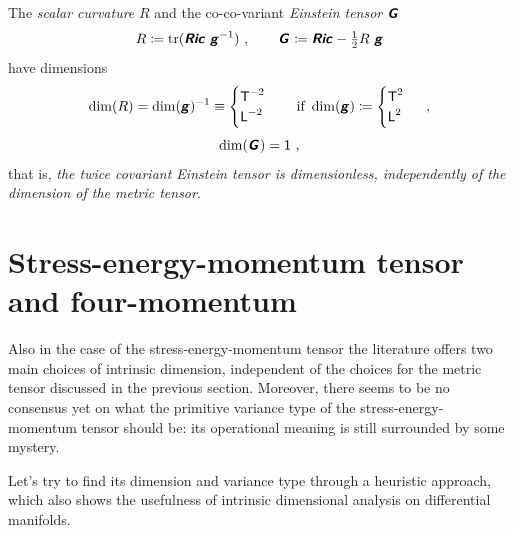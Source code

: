\documentclass[\ifafour a4paper,12pt,\else a5paper,10pt,\fi%
onecolumn,oneside,article,%
british%
]{memoir}
\makeatletter
\theoremstyle{remark}
\theoremstyle{innote}
\newcommand*{\mathte}[1]{\textbf{\textit{\textsf{#1}}}}
\DeclareMathOperator{\tr}{tr}%
\newcommand*{\defd}{\coloneqq}
\renewcommand*{\|}[1][]{\nonscript\,#1\vert\nonscript\;\mathopen{}}
\newcommand*{\q}{}%
\DeclareRobustCommand*{\q}{%
  \mathbin{\mathpalette\bigcdot@{}}%
}
\newcommand*{\bigcdot@scalefactor}{0.7}
\newcommand*{\bigcdot@widthfactor}{1.5}
\newcommand*{\bigcdot@}[2]{%
  \sbox0{$#1\vcenter{}$}%
  \sbox2{$#1\cdot\m@th$}%
  \hbox to \bigcdot@widthfactor\wd2{%
    \hfil
    \raise\ht0\hbox{%
      \scalebox{\bigcdot@scalefactor}{%
        \lower\ht0\hbox{$#1\bullet\m@th$}%
      }%
    }%
    \hfil
  }%
}
\newcommand*{\Un}{\textsf{1}}
\newcommand*{\Le}{\textsf{L}}
\newcommand*{\Ti}{\textsf{T}}
\newcommand*{\yg}{\mathte{g}}
\newcommand*{\yG}{\mathte{G}}
\newcommand*{\yRi}{\mathte{Ric}}
\newcommand*{\ysc}{R}
\renewcommand*{\i}{\indices}
\makeatother
\begin{document}
\medskip

The \emph{scalar curvature} $\ysc$ and the co-co-variant \emph{Einstein
  tensor} $\yG\i{_{\q\q}}$
\begin{equation}
  \label{eq:curv_einst}
  \ysc \defd %
  \tr(\yRi\ \yg^{-1})
  \ ,
  \qquad
  \yG\i{_{\q\q}} \defd \yRi -%
  \tfrac{1}{2} \ysc\ \yg %
\end{equation}
have  dimensions
\begin{gather}
  \label{eq:dim_scalcurv}
  \dim(\ysc) = \dim(\yg)^{-1} \equiv
  \begin{cases}
    \Ti^{-2} \\
    \Le^{-2}
  \end{cases}
  \quad\text{if }\dim(\yg)\defd
  \begin{cases}
     \Ti^2 \\
    \Le^2
  \end{cases}\ ,
  \\[\jot]
  \label{eq:dim_einst}
  \dim(\yG\i{_{\q\q}}) = \Un \ ,
\end{gather}
that is, \emph{the twice covariant Einstein tensor is dimensionless,
  independently of the dimension of the metric tensor}.

\section{Stress-energy-momentum tensor and four-momentum}
\label{sec:stressenergy}

Also in the case of the stress-energy-momentum tensor the literature offers
two main choices of intrinsic dimension, independent of the choices for the
metric tensor discussed in the previous section. Moreover, there seems to
be no consensus yet on what the primitive variance type of the
stress-energy-momentum tensor should be: its operational meaning is still
surrounded by some mystery.

Let's try to find its dimension and variance type through a heuristic
approach, which also shows the usefulness of intrinsic dimensional analysis
on differential manifolds.
\end{document}
